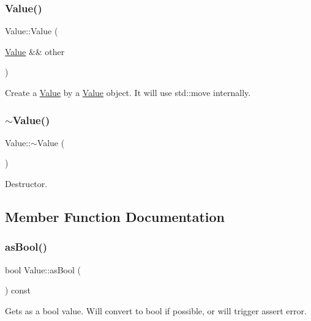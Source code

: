\subsubsection{\texorpdfstring{Value()}{Value()}\hspace{0.1cm}{\footnotesize\ttfamily [34/34]}}
{\footnotesize\ttfamily Value\+::\+Value (\begin{DoxyParamCaption}\item[{\hyperlink{classValue}{Value} \&\&}]{other }\end{DoxyParamCaption})}

Create a \hyperlink{classValue}{Value} by a \hyperlink{classValue}{Value} object. It will use std\+::move internally. \mbox{\label{classValue_a3a578f458da8a4ab67052dba0f7bffdd}} 
\subsubsection{\texorpdfstring{$\sim$\+Value()}{~Value()}\hspace{0.1cm}{\footnotesize\ttfamily [2/2]}}
{\footnotesize\ttfamily Value\+::$\sim$\+Value (\begin{DoxyParamCaption}{ }\end{DoxyParamCaption})}

Destructor. 

\subsection{Member Function Documentation}
\mbox{\label{classValue_a3f49bd86a14537ca63f59297513e80eb}} 
\subsubsection{\texorpdfstring{as\+Bool()}{asBool()}\hspace{0.1cm}{\footnotesize\ttfamily [1/2]}}
{\footnotesize\ttfamily bool Value\+::as\+Bool (\begin{DoxyParamCaption}{ }\end{DoxyParamCaption}) const}

Gets as a bool value. Will convert to bool if possible, or will trigger assert error. \mbox{\label{classValue_a3f49bd86a14537ca63f59297513e80eb}} 
